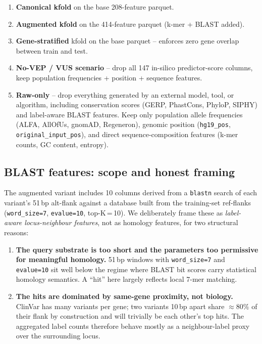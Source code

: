 \documentclass[11pt,a4paper]{article}
\begin{document}
\begin{enumerate}[leftmargin=*]
 \item \textbf{Canonical kfold} on the base 208-feature parquet.
 \item \textbf{Augmented kfold} on the 414-feature parquet (k-mer + BLAST added).
 \item \textbf{Gene-stratified} kfold on the base parquet -- enforces zero gene
 overlap between train and test.
 \item \textbf{No-VEP / VUS scenario} -- drop all 147 in-silico predictor-score
 columns, keep population frequencies + position + sequence features.
 \item \textbf{Raw-only} -- drop everything generated by an external model, tool,
 or algorithm, including conservation scores (GERP, PhastCons, PhyloP, SIPHY)
 and label-aware BLAST features. Keep only population allele frequencies
 (ALFA, AllOfUs, gnomAD, Regeneron), genomic position (\texttt{hg19\_pos},
 \texttt{original\_input\_pos}), and direct sequence-composition features
 (k-mer counts, GC content, entropy).
\end{enumerate}

\subsection{BLAST features: scope and honest framing}
\label{sec:blast-caveat}

The augmented variant includes 10 columns derived from a \texttt{blastn}
search of each variant's 51\,bp alt-flank against a database built from the
training-set ref-flanks (\texttt{word\_size=7},
\texttt{evalue=10}, top-K\,=\,10). We deliberately frame these as
\emph{label-aware locus-neighbour features}, not as homology features, for
two structural reasons:

\begin{enumerate}[leftmargin=*]
 \item \textbf{The query substrate is too short and the parameters too
 permissive for meaningful homology.} 51\,bp windows with
 \texttt{word\_size=7} and \texttt{evalue=10} sit well below the
 regime where BLAST bit scores carry statistical homology semantics.
 A ``hit'' here largely reflects local 7-mer matching.
 \item \textbf{The hits are dominated by same-gene proximity, not biology.}
 ClinVar has many variants per gene; two variants 10\,bp apart share
 $\approx 80\%$ of their flank by construction and will trivially be
 each other's top hits. The aggregated label counts therefore
 behave mostly as a neighbour-label proxy over the surrounding locus.
\end{enumerate}
\end{document}
